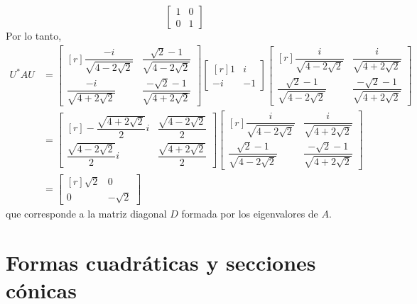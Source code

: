 \begin{example}
$$\begin{bmatrix}
        1 & 0 \\
        0 & 1
    \end{bmatrix}$$\newpage\noindent
    Por lo tanto,
    \begin{align*}
        U^*AU & = \begin{bmatrix*}[r]
            \dfrac{-i}{\sqrt{4 - 2\sqrt{2}}} &  \dfrac{\sqrt{2} - 1}{\sqrt{4 - 2\sqrt{2}}} \\[3.5mm]
            \dfrac{-i}{\sqrt{4 + 2\sqrt{2}}} & \dfrac{- \sqrt{2} - 1}{\sqrt{4 + 2\sqrt{2}}}
        \end{bmatrix*} \begin{bmatrix*}[r]
            1 & i \\
            -i & -1
        \end{bmatrix*} \begin{bmatrix*}[r]
            \dfrac{i}{\sqrt{4 - 2\sqrt{2}}} & \dfrac{i}{\sqrt{4 + 2\sqrt{2}}} \\[3.5mm]
            \dfrac{\sqrt{2} - 1}{\sqrt{4 - 2\sqrt{2}}} & \dfrac{- \sqrt{2} - 1}{\sqrt{4 + 2\sqrt{2}}}
        \end{bmatrix*} \\
        & = \begin{bmatrix*}[r]
            -\dfrac{\sqrt{4 + 2\sqrt{2}}}{2}i & \dfrac{\sqrt{4 - 2\sqrt{2}}}{2} \\[3.5mm]
            \dfrac{\sqrt{4 - 2\sqrt{2}}}{2}i & \dfrac{\sqrt{4 + 2\sqrt{2}}}{2}
        \end{bmatrix*} \begin{bmatrix*}[r]
            \dfrac{i}{\sqrt{4 - 2\sqrt{2}}} & \dfrac{i}{\sqrt{4 + 2\sqrt{2}}} \\[3.5mm]
            \dfrac{\sqrt{2} - 1}{\sqrt{4 - 2\sqrt{2}}} & \dfrac{- \sqrt{2} - 1}{\sqrt{4 + 2\sqrt{2}}}
        \end{bmatrix*} \\
        & = \begin{bmatrix*}[r]
            \sqrt{2} & 0 \\
            0 & - \sqrt{2}
        \end{bmatrix*}
    \end{align*}
    que corresponde a la matriz diagonal $D$ formada por los eigenvalores de $A$.
\end{example}

\section{Formas cuadráticas y secciones cónicas}

